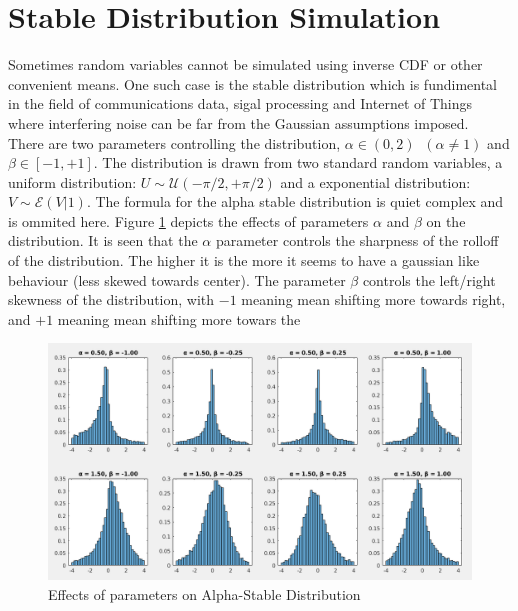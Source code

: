 \documentclass{article}
\begin{document}
\section{Stable Distribution Simulation}
Sometimes random variables cannot be simulated using inverse CDF or other convenient means. One such case is the stable distribution which is fundimental in the field of communications data, sigal processing and Internet of Things where interfering noise can be far from the Gaussian assumptions imposed.\\
There are two parameters controlling the distribution, $\alpha \in (0,2)\;\; (\alpha \neq 1)$ and $\beta \in [-1,+1]$. The distribution is drawn from two standard random variables, a uniform distribution: $U\sim \mathcal{U}(-\pi/2,+\pi/2)$ and a exponential distribution: $V\sim \mathcal{E}(V|1)$. The formula for the alpha stable distribution is quiet complex and is ommited here. Figure \ref{fig:stable} depicts the effects of parameters $\alpha$ and $\beta$ on the distribution. It is seen that the $\alpha$ parameter controls the sharpness of the rolloff of the distribution. The higher it is the more it seems to have a gaussian like behaviour (less skewed towards center). The parameter $\beta$ controls the left/right skewness of the distribution, with $-1$ meaning mean shifting more towards right, and $+1$ meaning mean shifting more towars the
\begin{figure}[htp]
 \centering
 \includegraphics[width=0.9\linewidth]{task_6.png}
 \caption{Effects of parameters on Alpha-Stable Distribution}
 \label{fig:stable}
\end{figure}
\end{document}

